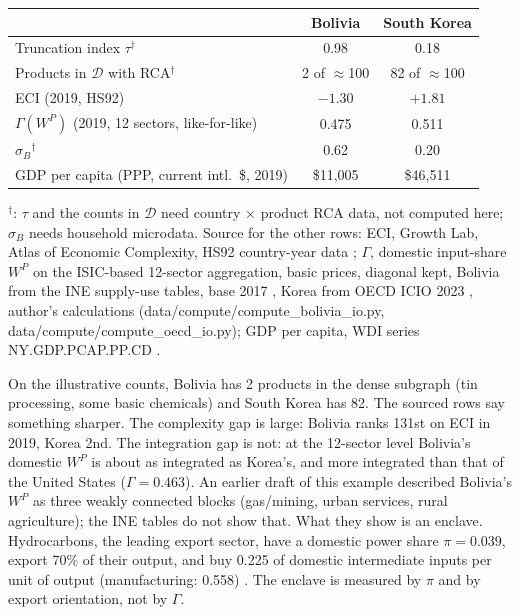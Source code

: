 \documentclass[../structural_economics_book.tex]{subfiles}
\begin{document}
\begin{example}\label{ch25:ex:missing}
\begin{center}
\begin{tabular}{lcc}
\toprule
& Bolivia & South Korea \\
\midrule
Truncation index $\tau$$^\dagger$ & 0.98 & 0.18 \\
Products in $\mathcal{D}$ with RCA$^\dagger$ & 2 of $\approx$100 & 82 of $\approx$100 \\
ECI (2019, HS92) & $-1.30$ & $+1.81$ \\
$\Gamma(W^P)$ (2019, 12 sectors, like-for-like) & 0.475 & 0.511 \\
$\sigma_B$$^\dagger$ & 0.62 & 0.20 \\
GDP per capita (PPP, current intl.\ \$, 2019) & \$11,005 & \$46,511 \\
\bottomrule
\end{tabular}
\par\footnotesize $^\dagger$\illustrative: $\tau$ and the counts in $\mathcal{D}$ need country $\times$ product RCA data, not computed here; $\sigma_B$ needs household microdata. Source for the other rows: ECI, Growth Lab, Atlas of Economic Complexity, HS92 country-year data \citep{growthlab2026atlas}; $\Gamma$, domestic input-share $W^P$ on the ISIC-based 12-sector aggregation, basic prices, diagonal kept, Bolivia from the INE supply-use tables, base 2017 \citep{ine2026sut}, Korea from OECD ICIO 2023 \citep{oecd2023icio}, author's calculations (data/compute/compute\_bolivia\_io.py, data/compute/compute\_oecd\_io.py); GDP per capita, WDI series NY.GDP.PCAP.PP.CD \citep{worldbank2026wdi}.
\end{center}

On the illustrative counts, Bolivia has 2 products in the dense subgraph (tin processing, some basic chemicals) and South Korea has 82. The sourced rows say something sharper. The complexity gap is large: Bolivia ranks 131st on ECI in 2019, Korea 2nd. The integration gap is not: at the 12-sector level Bolivia's domestic $W^P$ is about as integrated as Korea's, and more integrated than that of the United States ($\Gamma = 0.463$). An earlier draft of this example described Bolivia's $W^P$ as three weakly connected blocks (gas/mining, urban services, rural agriculture); the INE tables do not show that. What they show is an enclave. Hydrocarbons, the leading export sector, have a domestic power share $\pi = 0.039$, export 70\% of their output, and buy 0.225 of domestic intermediate inputs per unit of output (manufacturing: 0.558) \citep{ine2026sut}. The enclave is measured by $\pi$ and by export orientation, not by $\Gamma$.
\end{example}
\end{document}
